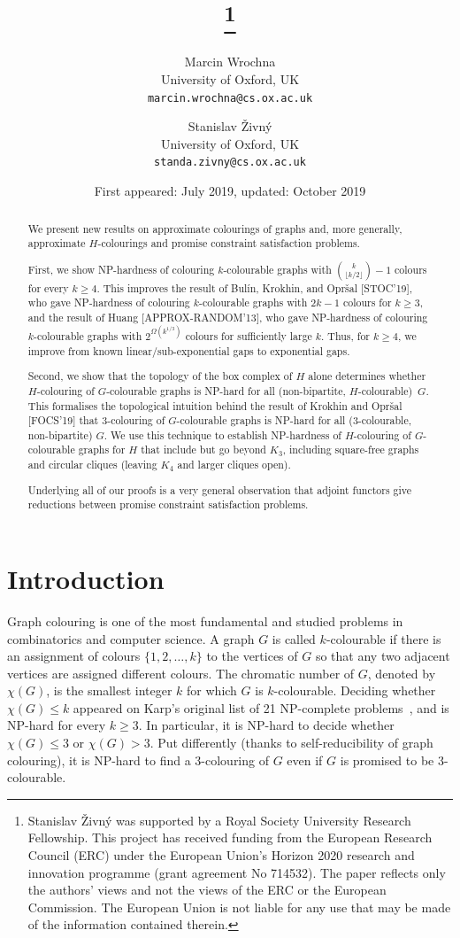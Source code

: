 \documentclass[11pt,a4paper]{scrartcl}
\title{\theTitle\thanks{Stanislav \v{Z}ivn\'y was supported by a Royal Society
University Research Fellowship. This project has received funding from the
European Research Council (ERC) under the European Union's Horizon 2020 research
and innovation programme (grant agreement No 714532). The paper reflects only
the authors' views and not the views of the ERC or the European Commission. The
European Union is not liable for any use that may be made of the information
contained therein.}}
\author{
Marcin Wrochna\\
University of Oxford, UK\\
\texttt{marcin.wrochna@cs.ox.ac.uk}
\and
Stanislav \v{Z}ivn\'{y}\\
University of Oxford, UK\\
\texttt{standa.zivny@cs.ox.ac.uk}
}
\date{\small First appeared: July 2019, updated: October 2019}
\numberwithin{theorem}{section}
\theoremstyle{definition}
\begin{document}
\maketitle

\vspace*{-1em}	
\begin{abstract}

  We present new results on approximate colourings of graphs and, more
  generally, approximate $H$-colourings and promise constraint satisfaction
  problems.
  
  First, we show NP-hardness of colouring $k$-colourable graphs with
  $\binom{k}{\lfloor k/2\rfloor}-1$ colours for every $k\geq 4$. This improves
  the result of Bul\'in, Krokhin, and Opr\v{s}al [STOC'19], who gave NP-hardness
  of colouring $k$-colourable graphs with $2k-1$ colours for $k\geq 3$, and the
  result of Huang [APPROX-RANDOM'13], who gave NP-hardness of
  colouring $k$-colourable graphs with $2^{\Omega(k^{1/3})}$ colours for sufficiently
  large $k$. Thus, for $k\geq 4$, we improve from known linear/sub-exponential gaps
  to exponential gaps.
  
  Second, we show that the topology of the box complex of $H$ 
  alone determines whether $H$-colouring of $G$-colourable graphs is NP-hard for all (non-bipartite, $H$-colourable)~$G$.  
  This formalises the topological intuition behind the result of Krokhin and Opr\v{s}al [FOCS'19] that
  $3$-colouring of $G$-colourable graphs is NP-hard for all ($3$-colourable,
  non-bipartite) $G$.
  We use this technique to establish
  NP-hardness of $H$-colouring of $G$-colourable graphs for $H$ that include but
  go beyond $K_3$, including square-free graphs and circular cliques (leaving $K_4$ and larger cliques open).

  Underlying all of our proofs is a very general observation that adjoint
  functors give reductions between promise constraint satisfaction problems.

\end{abstract}

\section{Introduction}

Graph colouring is one of the most fundamental and studied problems in
combinatorics and computer science. A graph $G$ is called $k$-colourable if
there is an assignment of colours $\{1,2,\ldots,k\}$ to the vertices of $G$ so
that any two adjacent vertices are assigned different colours. The chromatic
number of $G$, denoted by $\chi(G)$, is the smallest integer $k$ for which $G$ is
$k$-colourable. Deciding whether $\chi(G)\leq k$ appeared on Karp's original
list of 21 NP-complete problems~\cite{Karp72:reducibility}, and is NP-hard for
every $k\geq 3$. In particular, it is NP-hard to decide whether $\chi(G)\leq 3$
or $\chi(G)>3$. Put differently (thanks to self-reducibility of graph
colouring), it is NP-hard to find a $3$-colouring of $G$ even if $G$ is promised
to be $3$-colourable. 
\end{document}
